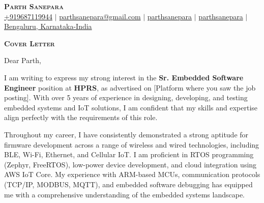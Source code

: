 \documentclass[letterpaper,11pt]{article}
\newcommand{\HiringManager}{Parth}
\newcommand{\CompanyName}{HPRS}
\newcommand{\Position}{Sr. Embedded Software Engineer}
\begin{document}

\begin{center}
    \textbf{\Huge \scshape Parth Sanepara} \\ \vspace{3pt}
    \small
    \faMobile \hspace{.5pt} \href{tel:9687119944}{+919687119944}
    $|$
    \faEnvelope \hspace{.5pt} \href{mailto:parthsanepara@gmail.com}{parthsanepara@gmail.com}
    $|$
    \faLinkedinSquare \hspace{.5pt} \href{https://www.linkedin.com/in/parthsanepara}{parthsanepara}
    $|$
    \faGithub \hspace{.5pt} \href{https://github.com/parthsanepara}{parthsanepara}
    $|$
    \faMapMarker \hspace{.5pt} \href{https://maps.app.goo.gl/cc5ibm6jAiXmRFp17}{Bengaluru, Karnataka-India}
\end{center}

\vspace{1cm}

\begin{center}
    \textbf{\Large \scshape Cover Letter} \\ \vspace{3pt}
\end{center}

\vspace{2cm}

  Dear \HiringManager{},\\ \vspace{3pt}

  I am writing to express my strong interest in the \textbf{\Position{}} position at \textbf{\CompanyName{}}, 
  as advertised on [Platform where you saw the job posting]. With over 5 years of experience in designing, developing,
  and testing embedded systems and IoT solutions, I am confident that my skills and expertise align perfectly with the 
  requirements of this role. \\ \vspace{3pt}

  Throughout my career, I have consistently demonstrated a strong aptitude for firmware development across a range of 
  wireless and wired technologies, including BLE, Wi-Fi, Ethernet, and Cellular IoT. I am proficient in RTOS programming 
  (Zephyr, FreeRTOS), low-power device development, and cloud integration using AWS IoT Core. My experience with ARM-based MCUs, 
  communication protocols (TCP/IP, MODBUS, MQTT), and embedded software debugging has equipped me with a comprehensive 
  understanding of the embedded systems landscape. \\ \vspace{3pt}
\end{document}
